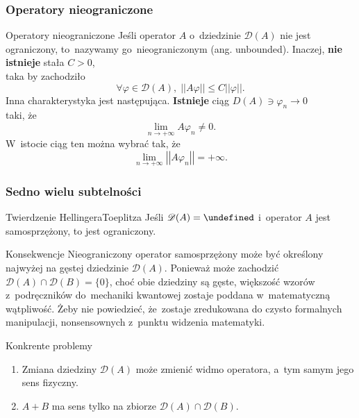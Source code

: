 \documentclass{beamer} \mode<presentation>
\newcommand{\tb}{\textbf}
\newcommand{\mc}{\mathcal}
\newcommand{\ra}{\rightarrow}
\newcommand{\vp}{\varphi}
\newcommand{\D}{\mc{D}}
\let\H\undefined
\newcommand{\H}{\mc{H}}
\newcommand{\Lim}{\lim\limits}
\newcommand{\norm}[1]{\left|\left| #1 \right|\right|}
\begin{document}
\begin{frame}
  \frametitle{Operatory nieograniczone}

  \begin{block}{Operatory nieograniczone}
    Jeśli operator $A$ o~dziedzinie $\D( A )$ nie jest ograniczony,
    to~nazywamy go~nieograniczonym (ang. unbounded). Inaczej, \tb{nie
      istnieje} stała $C > 0$, \\
    taka by zachodziło
    \begin{equation}
      \label{eq:5}
      \forall \vp \in \D(A), \; \norm{ A \vp } \leq C \norm{ \vp }.
    \end{equation}
    Inna charakterystyka jest następująca. \tb{Istnieje} ciąg
    $D( A ) \ni \vp_{ n } \ra 0$ \\
    taki, że
    \begin{equation}
      \label{eq:4}
      \Lim_{ n \ra +\infty } A \vp_{ n } \neq 0.
    \end{equation}
    W~istocie ciąg ten można wybrać tak, że
    \begin{equation}
      \label{eq:4}
      \Lim_{ n \ra +\infty } \norm{ A \vp_{ n } } = +\infty.
    \end{equation}
  \end{block}
  
\end{frame}



\begin{frame}
  \frametitle{Sedno wielu subtelności}

  \begin{block}{Twierdzenie Hellingera\dywiz Toeplitza}
    Jeśli $\D( A ) = \H$ i~operator $A$ jest samosprzężony, to jest
    ograniczony.
  \end{block}

  \begin{block}{Konsekwencje}
    Nieograniczony operator samosprzężony może być określony najwyżej
    na gęstej dziedzinie $\D( A )$. Ponieważ może zachodzić
    $\D( A ) \cap \D( B ) = \{ 0 \}$, choć obie dziedziny są gęste,
    większość wzorów z~podręczników do~mechaniki kwantowej zostaje
    poddana w~matematyczną wątpliwość. Żeby nie powiedzieć, że~zostaje
    zredukowana do czysto formalnych manipulacji, nonsensownych
    z~punktu widzenia matematyki.
  \end{block}

  \begin{block}{Konkrente problemy}
    \begin{enumerate}
    \item Zmiana dziedziny $\D( A )$ może zmienić widmo operatora,
      a~tym samym jego sens fizyczny.
    \item $A + B$ ma sens tylko na zbiorze $\D( A ) \cap \D( B )$.
    \end{enumerate}
  \end{block}
  
\end{frame}
\end{document}
